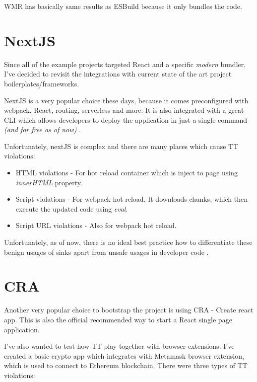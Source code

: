 WMR has basically same results as ESBuild because it only bundles the code.

\section{NextJS}

Since all of the example projects targeted React and a specific \emph{modern} bundler, I've decided
to revisit the integrations with current state of the art project boilerplates/frameworks.

NextJS is a very popular choice these days, because it comes preconfigured with webpack, React,
routing, serverless and more. It is also integrated with a great CLI which allows developers to
deploy the application in just a single command \emph{(and for free as of now)} \cite{nextjs_web}.

Unfortunately, nextJS is complex and there are many places which cause TT violations:

\begin{itemize}
  \item  HTML violations - For hot reload container which is inject to page using \emph{innerHTML}
        property.
  \item  Script violations - For webpack hot reload. It downloads chunks, which then execute the
        updated code using \emph{eval}.
  \item  Script URL violations - Also for webpack hot reload.
\end{itemize}

Unfortunately, as of now, there is no ideal best practice how to differentiate these benign usages
of sinks apart from unsafe usages in developer code \cite{tt_source_file_violation_issue}.

\section{CRA}

Another very popular choice to bootstrap the project is using CRA - Create react app. This is also
the official recommended way to start a React single page application.

I've also wanted to test how TT play together with browser extensions. I've created a basic crypto
app which integrates with Metamask browser extension, which is used to connect to Ethereum
blockchain. There were three types of TT violations:

